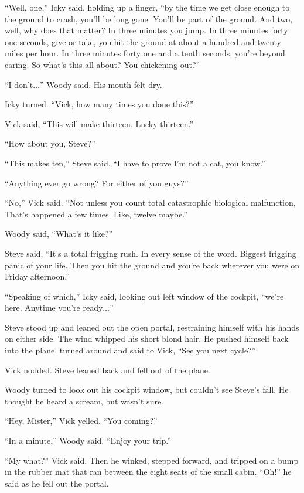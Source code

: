 ``Well, one,'' Icky said, holding up a finger, ``by the time we get close enough to the ground to crash, you'll be long gone. You'll be part of the ground. And two, well, why does that matter? In three minutes you jump. In three minutes forty one seconds, give or take, you hit the ground at about a hundred and twenty miles per hour. In three minutes forty one and a tenth seconds, you're beyond caring. So what's this all about? You chickening out?''

``I don't$\ldots$'' Woody said. His mouth felt dry.

Icky turned. ``Vick, how many times you done this?''

Vick said, ``This will make thirteen. Lucky thirteen.''

``How about you, Steve?''

``This makes ten,'' Steve said. ``I have to prove I'm not a cat, you know.''

``Anything ever go wrong? For either of you guys?''

``No,'' Vick said. ``Not unless you count total catastrophic biological malfunction, That's happened a few times. Like, twelve maybe.''

Woody said, ``What's it like?''

Steve said, ``It's a total frigging rush. In every sense of the word. Biggest frigging panic of your life. Then you hit the ground and you're back wherever you were on Friday afternoon.''

``Speaking of which,'' Icky said, looking out left window of the cockpit, ``we're here. Anytime you're ready$\ldots$''

Steve stood up and leaned out the open portal, restraining himself with his hands on either side. The wind whipped his short blond hair. He pushed himself back into the plane, turned around and said to Vick, ``See you next cycle?''

Vick nodded. Steve leaned back and fell out of the plane.

Woody turned to look out his cockpit window, but couldn't see Steve's fall. He thought he heard a scream, but wasn't sure.

``Hey, Mister,'' Vick yelled. ``You coming?''

``In a minute,'' Woody said. ``Enjoy your trip.''

``My what?'' Vick said. Then he winked, stepped forward, and tripped on a bump in the rubber mat that ran between the eight seats of the small cabin. ``Oh!'' he said as he fell out the portal.

